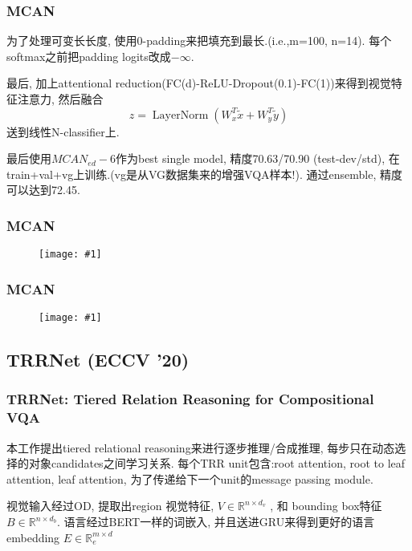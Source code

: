\documentclass{beamer}
\newcommand{\cfig}[2]{
    \begin{figure}[htbp]
    \centering
    \texttt{[image: \#1]}
\end{figure}
}
\begin{document}
\begin{frame}
    \frametitle{MCAN}

    为了处理可变长长度, 使用0-padding来把填充到最长.(i.e.,m=100, n=14). 每个softmax之前把padding logits改成$-\infty$.

    最后, 加上attentional reduction(FC(d)-ReLU-Dropout(0.1)-FC(1))来得到视觉特征注意力, 然后融合
    \begin{equation}
        z=\operatorname{LayerNorm}\left(W_{x}^{T} \tilde{x}+W_{y}^{T} \tilde{y}\right)
    \end{equation}
    送到线性N-classifier上.
    
    最后使用$MCAN_{ed}-6$作为best single model, 精度70.63/70.90 (test-dev/std), 在train+val+vg上训练.(vg是从VG数据集来的增强VQA样本!). 通过ensemble, 精度可以达到72.45.

\end{frame}
\begin{frame}
    \frametitle{MCAN}

    \cfig{mcan-mod.png}{0.9}

\end{frame}

\begin{frame}
    \frametitle{MCAN}

    \cfig{mcan-arch2.png}{0.8}

\end{frame}


\subsection{TRRNet (ECCV '20)}

\begin{frame}
    \frametitle{TRRNet: Tiered Relation Reasoning for Compositional VQA}

    本工作提出tiered relational reasoning来进行逐步推理/合成推理, 每步只在动态选择的对象candidates之间学习关系. 每个TRR unit包含:root attention, root to leaf attention, leaf attention, 为了传递给下一个unit的message passing module.

    视觉输入经过OD, 提取出region 视觉特征, $V \in \mathbb{R}^{n \times d_{v}}$
    , 和 bounding box特征$B \in \mathbb{R}^{n \times d_{b}}$.
    语言经过BERT一样的词嵌入, 并且送进GRU来得到更好的语言embedding $E \in \mathbb{R}^{m \times d}_{e}$

\end{frame}
\end{document}
